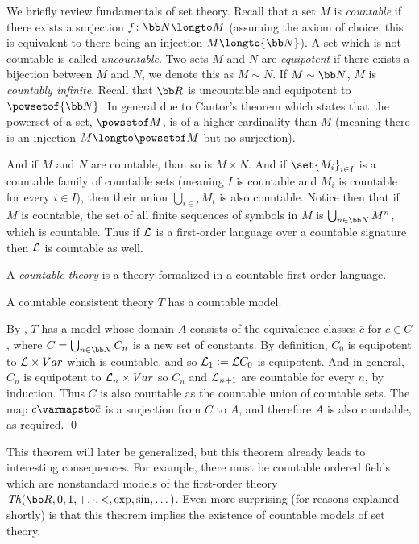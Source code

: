 We briefly review fundamentals of set theory.
Recall that a set $M$ is {\it countable} if there exists a surjection $f\colon{\bb N}\longto M$ (assuming the axiom of choice, this is equivalent to there being an injection
$M\longto{\bb N}$).
A set which is not countable is called {\it uncountable}.
Two sets $M$ and $N$ are {\it equipotent} if there exists a bijection between $M$ and $N$, we denote this as $M\sim N$.
If $M\sim{\bb N}$, $M$ is {\it countably infinite}.
Recall that ${\bb R}$ is uncountable and equipotent to $\powsetof{\bb N}$.
In general due to Cantor's theorem which states that the powerset of a set, $\powsetof M$, is of a higher cardinality than $M$ (meaning there is an injection $M\longto\powsetof M$ but no surjection).

And if $M$ and $N$ are countable, than so is $M\times N$.
And if $\set{M_i}_{i\in I}$ is a countable family of countable sets (meaning $I$ is countable and $M_i$ is countable for every $i\in I$), then their union $\bigcup_{i\in I}M_i$ is also countable.
Notice then that if $M$ is countable, the set of all finite sequences of symbols in $M$ is $\bigcup_{n\in{\bb N}}M^n$, which is countable.
Thus if ${\cal L}$ is a first-order language over a countable signature then ${\cal L}$ is countable as well.

A {\it countable theory} is a theory formalized in a countable first-order language.

\bthrm[title=L\"owenheim-Skolem Theorem, name=lowenheimskolem]

    A countable consistent theory $T$ has a countable model.

\ethrm

By , $T$ has a model whose domain $A$ consists of the equivalence classes $\overline c$ for $c\in C$, where $C=\bigcup_{n\in{\bb N}}C_n$ is a new set of constants.
By definition, $C_0$ is equipotent to ${\cal L}\times\Var$ which is countable, and so ${\cal L}_1\coloneqq{\cal L}C_0$ is equipotent.
And in general, $C_n$ is equipotent to ${\cal L}_n\times\Var$ so $C_n$ and ${\cal L}_{n+1}$ are countable for every $n$, by induction.
Thus $C$ is also countable as the countable union of countable sets.
The map $c\varmapsto\overline c$ is a surjection from $C$ to $A$, and therefore $A$ is also countable, as required.
\qed

This theorem will later be generalized, but this theorem already leads to interesting consequences.
For example, there must be countable ordered fields which are nonstandard models of the first-order theory $\Th({\bb R},0,1,+,\cdot,<,\exp,\sin,\dots)$.
Even more surprising (for reasons explained shortly) is that this theorem implies the existence of countable models of set theory.

